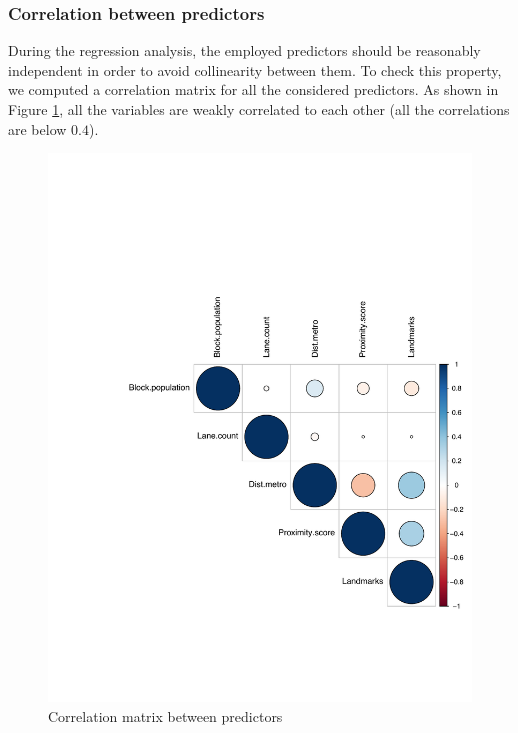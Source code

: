 \documentclass[12pt]{article}
\begin{document}
	
	


\subsubsection{Correlation between predictors}

During the regression analysis, the employed predictors should be reasonably independent in order to avoid collinearity between them.
To check this property, we computed a correlation matrix for all the considered predictors.
As shown in Figure \ref{corrplot}, all the variables are weakly correlated to each other (all the correlations are below $0.4$).


\begin{figure}[H]
	\centering
	\includegraphics[scale=0.7]{Pictures/corrplot}
	\caption{Correlation matrix between predictors}\label{corrplot}
\end{figure}
\end{document}
